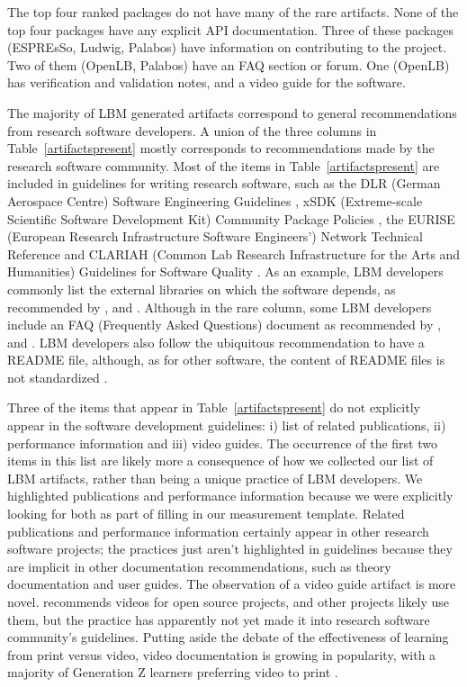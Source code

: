 \documentclass[final, 3p, times, authoryear]{elsarticle}
\begin{document}
The top four ranked packages do not have many of the rare artifacts. None of the
top four packages have any explicit API documentation. Three of these packages
(ESPREsSo, Ludwig, Palabos) have information on contributing to the project. Two
of them (OpenLB, Palabos) have an FAQ section or forum. One (OpenLB) has
verification and validation notes, and a video guide for the software. 

The majority of LBM generated artifacts correspond to general recommendations
from research software developers.  A union of the three columns in
Table~\ref{artifactspresent} mostly corresponds to recommendations made by the
research software community.  Most of the items in Table~\ref{artifactspresent}
are included in guidelines for writing research software, such as the DLR
(German Aerospace Centre) Software Engineering Guidelines
\citep{TobiasEtAl2018}, xSDK (Extreme-scale Scientific Software Development Kit)
Community Package Policies \citep{SmithAndRoscoe2018}, the EURISE (European
Research Infrastructure Software Engineers') Network Technical Reference
\cite{ThielEtAl2020} and CLARIAH (Common Lab Research Infrastructure for the
Arts and Humanities) Guidelines for Software Quality \citep{vanGompelEtAl2016}.
As an example, LBM developers commonly list the external libraries on which the
software depends, as recommended by \citet{BrettEtAl2021},
\citet{SmithAndRoscoe2018} and \citet{vanGompelEtAl2016}. Although in the rare
column, some LBM developers include an FAQ (Frequently Asked Questions) document
as recommended by \citep{OrvizEtAl2017}, \citep{ThielEtAl2020} and
\citep{vanGompelEtAl2016}. LBM developers also follow the ubiquitous
recommendation to have a README file, although, as for other software, the
content of README files is not standardized \citep{PranaEtAl2018}.

Three of the items that appear in Table~\ref{artifactspresent} do not explicitly
appear in the software development guidelines: i) list of related publications,
ii) performance information and iii) video guides.  The occurrence of the first
two items in this list are likely more a consequence of how we collected our
list of LBM artifacts, rather than being a unique practice of LBM developers. We
highlighted publications and performance information because we were explicitly
looking for both as part of filling in our measurement template. Related
publications and performance information certainly appear in other research
software projects; the practices just aren't highlighted in guidelines because
they are implicit in other documentation recommendations, such as theory
documentation and user guides. The observation of a video guide artifact is more
novel.  \citet{Fogel2005} recommends videos for open source projects, and other
projects likely use them, but the practice has apparently not yet made it into
research software community's guidelines.  Putting aside the debate of the
effectiveness of learning from print versus video, video documentation is
growing in popularity, with a majority of Generation Z learners preferring video
to print \citep{Genota2018}.
\end{document}
